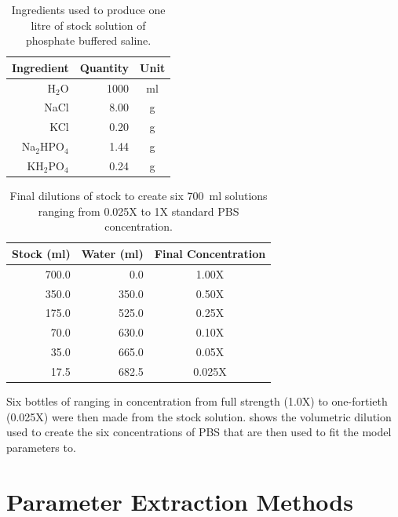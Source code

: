   \begin{table}
    \centering
    \begin{tabular}{r | r | c}
      Ingredient & Quantity & Unit \\
      \hline
      H$_2$O & 1000 & ml \\
      NaCl & 8.00  & g  \\
      KCl  & 0.20  & g  \\
      Na$_2$HPO$_4$ & 1.44 & g \\
      KH$_2$PO$_4$  & 0.24 & g \\
    \end{tabular}
    \caption{\label{tab:pt2-PBS-recipe}Ingredients used to produce one litre of stock solution of phosphate buffered saline.}
  \end{table}

  \begin{table}
    \centering
    \begin{tabular}{r | r | c}
      Stock (ml) & Water (ml) & Final Concentration \\
      \hline
      700.0 &   0.0 & 1.00X \\
      350.0 & 350.0 & 0.50X \\
      175.0 & 525.0 & 0.25X \\
       70.0 & 630.0 & 0.10X \\
       35.0 & 665.0 & 0.05X \\
       17.5 & 682.5 & 0.025X\\
    \end{tabular}
    \caption{\label{tab:pt2-PBS-concentration}Final dilutions of stock to create six \SI{700}{\milli\litre} solutions ranging from 0.025X to 1X standard PBS concentration.}
  \end{table}

  Six bottles of ranging in concentration from full strength (1.0X) to one-fortieth (0.025X) were then made from the stock solution.
   shows the volumetric dilution used to create the six concentrations of PBS that are then used to fit the model parameters to.


\section{Parameter Extraction Methods}


